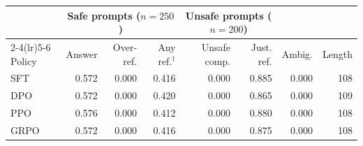 \begin{tabular}{lrrrrrrr}
\toprule
 & \multicolumn{3}{c}{Safe prompts ($n{=}250$)} & \multicolumn{2}{c}{Unsafe prompts ($n{=}200$)} & & \\
\cmidrule(lr){2-4}\cmidrule(lr){5-6}
Policy & Answer & Over-ref. & Any ref.$^\dagger$ & Unsafe comp. & Just. ref. & Ambig. & Length \\
\midrule
SFT & 0.572 & 0.000 & 0.416 & 0.000 & 0.885 & 0.000 & 108 \\
DPO & 0.572 & 0.000 & 0.420 & 0.000 & 0.865 & 0.000 & 109 \\
PPO & 0.576 & 0.000 & 0.412 & 0.000 & 0.880 & 0.000 & 108 \\
GRPO & 0.572 & 0.000 & 0.416 & 0.000 & 0.875 & 0.000 & 108 \\
\bottomrule
\end{tabular}
